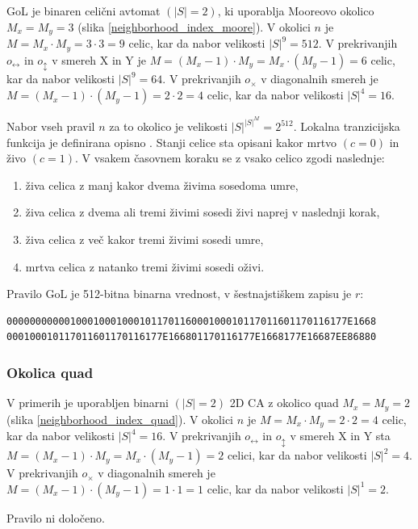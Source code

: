 \documentclass[12pt,a4paper,openany,twoside]{book}
\begin{document}
GoL je binaren celični avtomat \((|S|=2)\), ki uporablja Mooreovo okolico \(M_x=M_y=3\) (slika \ref{neighborhood_index_moore}).
V okolici \(n\) je \(M=M_x \cdot M_y=3 \cdot 3=9\) celic, kar da nabor velikosti \(|S|^9=512\).
V prekrivanjih \(o_{\leftrightarrow}\) in \(o_{\updownarrow}\) v smereh X in Y
je \(M=(M_x-1) \cdot M_y=M_x \cdot (M_y-1)=6\) celic, kar da nabor velikosti \(|S|^9=64\).
V prekrivanjih \(o_{\times}\) v diagonalnih smereh
je \(M=(M_x-1) \cdot (M_y-1)=2 \cdot 2=4\) celic, kar da nabor velikosti \(|S|^4=16\).

Nabor vseh pravil \(n\) za to okolico je velikosti \(|S|^{|S|^{M}}=2^{512}\).
Lokalna tranzicijska funkcija je definirana opisno \cite{WikiGoL}.
Stanji celice sta opisani kakor mrtvo \((c=0)\) in živo \((c=1)\).
V vsakem časovnem koraku se z vsako celico zgodi naslednje:
\begin{enumerate}
\item živa celica z manj kakor dvema živima sosedoma umre,
\item živa celica z dvema ali tremi živimi sosedi živi naprej v naslednji korak,
\item živa celica z več kakor tremi živimi sosedi umre,
\item mrtva celica z natanko tremi živimi sosedi oživi.
\end{enumerate}
Pravilo GoL je 512-bitna binarna vrednost, v šestnajstiškem zapisu je \(r\):
\begin{verbatim}
00000000000100010001000101170116000100010117011601170116177E1668
000100010117011601170116177E166801170116177E1668177E16687EE86880
\end{verbatim}

\subsubsection{Okolica quad}

V primerih je uporabljen binarni \((|S|=2)\) 2D CA z okolico quad \(M_x=M_y=2\) (slika \ref{neighborhood_index_quad}).
V okolici \(n\) je \(M=M_x \cdot M_y=2 \cdot 2=4\) celic, kar da nabor velikosti \(|S|^4=16\).
V prekrivanjih \(o_{\leftrightarrow}\) in \(o_{\updownarrow}\) v smereh X in Y
sta \(M=(M_x-1) \cdot M_y=M_x \cdot (M_y-1)=2\) celici, kar da nabor velikosti \(|S|^2=4\).
V prekrivanjih \(o_{\times}\) v diagonalnih smereh
je \(M=(M_x-1) \cdot (M_y-1)=1 \cdot 1=1\) celic, kar da nabor velikosti \(|S|^1=2\).

Pravilo ni določeno.
\end{document}
